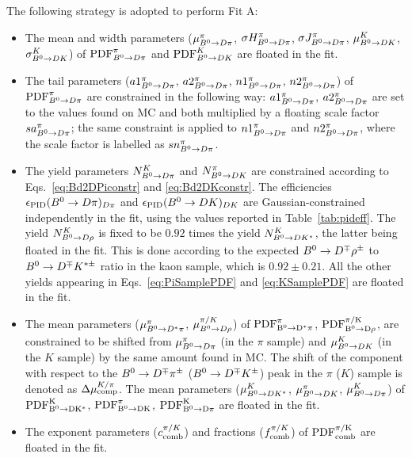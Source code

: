 The following strategy is adopted to perform Fit A:
\begin{itemize}[noitemsep,topsep=0pt]
	\item The mean and width parameters ($\mu^{\pi}_{B^0\rightarrow D\pi}$,
		$\sigma H^{\pi}_{B^0\rightarrow D\pi}$, $\sigma J^{\pi}_{B^0\rightarrow D\pi}$, $\mu^{K}_{B^0\rightarrow DK}$, $\sigma^{K}_{B^0\rightarrow DK}$)
		of ${\rm{PDF}}^{\pi}_{B^0\rightarrow D\pi}$ and ${\rm PDF}^{K}_{B^0\rightarrow DK}$ are floated in the fit.
	\item The tail parameters ($a1^{\pi}_{B^0\rightarrow D\pi}$, $a2^{\pi}_{B^0\rightarrow D\pi}$,
		$n1^{\pi}_{B^0\rightarrow D\pi}$, $n2^{\pi}_{B^0\rightarrow D\pi}$) of
		${\rm{PDF}}^{\pi}_{B^0\rightarrow D\pi}$ are constrained in the following way:
		$a1^{\pi}_{B^0\rightarrow D\pi}$, $a2^{\pi}_{B^0\rightarrow D\pi}$ are set to the values
		found on MC and both multiplied by a floating scale factor
		$sa^{\pi}_{B^0\rightarrow D\pi}$; the same constraint is applied to
		$n1^{\pi}_{B^0\rightarrow D\pi}$ and $n2^{\pi}_{B^0\rightarrow D\pi}$, where the scale
		factor is labelled as $sn^{\pi}_{B^0\rightarrow D\pi}$.
	\item The yield parameters $N^{K}_{B^0\rightarrow D\pi}$ and $N^{\pi}_{B^0\rightarrow DK}$ are
		constrained according to Eqs.~\ref{eq:Bd2DPiconstr} and \ref{eq:Bd2DKconstr}. The
		efficiencies $\epsilon_{\rm PID}(B^0\rightarrow D\pi)_{D\pi}$ and $\epsilon_{\rm
		PID}(B^0\rightarrow DK)_{DK}$ are Gaussian-constrained independently in the fit,
		using the values reported in Table~\ref{tab:pideff}. 
		The yield $N^{K}_{B^0\rightarrow D\rho}$ is fixed to be $0.92$ times
		the yield $N^{K}_{B^0\rightarrow DK^*}$, the latter being floated in the fit.
		This is done according to the expected $B^0\rightarrow D^\mp\rho^\pm$ to $B^0\rightarrow D^\mp K^{*\pm}$
		ratio in the kaon sample, which is $0.92\pm0.21$. All the other yields
		appearing in Eqs.~\ref{eq:PiSamplePDF} and
		\ref{eq:KSamplePDF} are floated in the fit.
	\item The mean parameters ($\mu^{\pi}_{B^0\rightarrow D^*\pi}$, $\mu^{\pi/K}_{B^0\rightarrow
		D\rho}$) of $\rm{PDF}^{\pi}_{B^0\rightarrow D^*\pi}$, $\rm{PDF}^{\pi/K}_{B^0\rightarrow
		D\rho}$, are constrained to be shifted from $\mu^{\pi}_{B^0\rightarrow D\pi}$
		(in the $\pi$ sample) and $\mu^{K}_{B^0\rightarrow DK}$ (in the $K$ sample) by
		the same amount found in MC. The shift of the component with
		respect to the $B^0\rightarrow D^\mp\pi^\pm$ ($B^0\rightarrow D^\mp K^{\pm}$) peak in the $\pi$ ($K$) sample 
                is denoted as $\Delta\mu^{K/\pi}_{\rm comp}$. The
		mean parameters ($\mu^{K}_{B^0\rightarrow DK^*}$, $\mu^{\pi}_{B^0\rightarrow DK}$,
		$\mu^{K}_{B^0\rightarrow D\pi}$) of $\rm{PDF}^{K}_{B^0\rightarrow DK^*}$,
		$\rm{PDF}^{\pi}_{B^0\rightarrow DK}$, $\rm{PDF}^{K}_{B^0\rightarrow D\pi}$ are floated in the
		fit.
	\item The exponent parameters ($c^{\pi/K}_{\rm comb}$) and fractions
		($f^{\pi/K}_{\rm comb}$) of $\rm{PDF}^{\pi/K}_{\rm comb}$ are floated in the
		fit.
\end{itemize}

